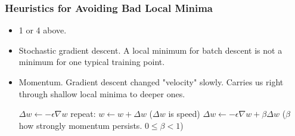 \documentclass[10pt]{article}
\begin{document}
\begin{itemize}
	\subsubsection*{Heuristics for Avoiding Bad Local Minima}
	\begin{itemize}
		\item 1 or 4 above.
		\item Stochastic gradient descent. A local minimum for batch descent is not a minimum for one typical training point.
		\item Momentum. Gradient descent changed "velocity" slowly. Carries us right through shallow local minima to deeper ones.
\begin{codeblock}
	$\Delta w \leftarrow -\epsilon \nabla w$
	repeat:
	    $w \leftarrow w + \Delta w$ ($\Delta w$ is speed)
	    $\Delta w \leftarrow - \epsilon \nabla w + \beta \Delta w$ ($\beta$ how strongly momentum persists. $0 \leq \beta < 1$)
\end{codeblock}
	\end{itemize}
\end{itemize}
\end{document}
